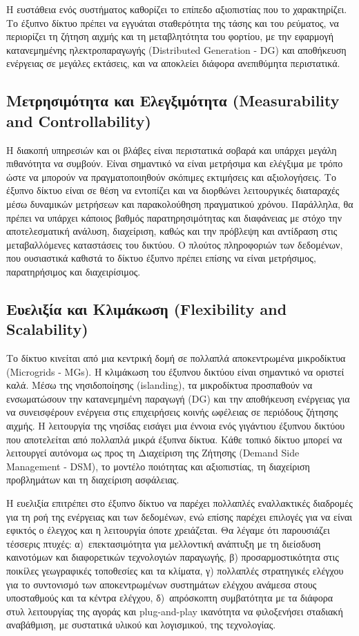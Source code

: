 \documentclass[12pt, a4paper, oneside]{report}
\begin{document}
Η ευστάθεια ενός συστήματος καθορίζει το επίπεδο αξιοπιστίας που το χαρακτηρίζει. Το έξυπνο δίκτυο πρέπει να εγγυάται σταθερότητα της τάσης και του ρεύματος, να περιορίζει τη ζήτηση αιχμής και τη μεταβλητότητα του φορτίου, με την εφαρμογή κατανεμημένης ηλεκτροπαραγωγής (Distributed Generation - DG) και αποθήκευση ενέργειας σε μεγάλες εκτάσεις, και να αποκλείει διάφορα ανεπιθύμητα περιστατικά.

\subsection*{Μετρησιμότητα και Ελεγξιμότητα (\textenglish{Measurability and Controllability})}

Η διακοπή υπηρεσιών και οι βλάβες είναι περιστατικά σοβαρά και υπάρχει μεγάλη πιθανότητα να συμβούν. Είναι σημαντικό να είναι μετρήσιμα και ελέγξιμα με τρόπο ώστε να μπορούν να πραγματοποιηθούν σκόπιμες εκτιμήσεις και αξιολογήσεις. Το έξυπνο δίκτυο είναι σε θέση να εντοπίζει και να διορθώνει λειτουργικές διαταραχές μέσω δυναμικών μετρήσεων και παρακολούθηση πραγματικού χρόνου. Παράλληλα, θα πρέπει να υπάρχει κάποιος βαθμός παρατηρησιμότητας και διαφάνειας με στόχο την αποτελεσματική ανάλυση, διαχείριση, καθώς και την πρόβλεψη και αντίδραση στις μεταβαλλόμενες καταστάσεις του δικτύου. Ο πλούτος πληροφοριών των δεδομένων, που ουσιαστικά καθιστά το δίκτυο έξυπνο πρέπει επίσης να είναι μετρήσιμος, παρατηρήσιμος και διαχειρίσιμος.

\subsection*{Ευελιξία και Κλιμάκωση (\textenglish{Flexibility and Scalability})}

Το δίκτυο κινείται από μια κεντρική δομή σε πολλαπλά αποκεντρωμένα μικροδίκτυα (Microgrids - MGs). Η κλιμάκωση του έξυπνου δικτύου είναι σημαντικό να οριστεί καλά. Μέσω της νησιδοποίησης (islanding), τα μικροδίκτυα προσπαθούν να ενσωματώσουν την κατανεμημένη παραγωγή (DG) και την αποθήκευση ενέργειας για να συνεισφέρουν ενέργεια στις επιχειρήσεις κοινής ωφέλειας σε περιόδους ζήτησης αιχμής. Η λειτουργία της νησίδας εισάγει μια έννοια ενός γιγάντιου έξυπνου δικτύου που αποτελείται από πολλαπλά μικρά έξυπνα δίκτυα. Κάθε τοπικό δίκτυο μπορεί να λειτουργεί αυτόνομα ως προς τη Διαχείριση της Ζήτησης (Demand Side Management - DSM), το μοντέλο ποιότητας και αξιοπιστίας, τη διαχείριση προβλημάτων και τη διαχείριση ασφάλειας.

Η ευελιξία επιτρέπει στο έξυπνο δίκτυο να παρέχει πολλαπλές εναλλακτικές διαδρομές για τη ροή της ενέργειας και των δεδομένων, ενώ επίσης παρέχει επιλογές για να είναι εφικτός ο έλεγχος και η λειτουργία όποτε χρειάζεται. Θα λέγαμε ότι παρουσιάζει τέσσερις πτυχές: \mbox{α) επεκτασιμότητα} για μελλοντική ανάπτυξη με τη διείσδυση καινοτόμων και διαφορετικών τεχνολογιών παραγωγής, β) προσαρμοστικότητα στις ποικίλες γεωγραφικές τοποθεσίες και τα κλίματα, γ) πολλαπλές στρατηγικές ελέγχου για το συντονισμό των αποκεντρωμένων συστημάτων ελέγχου ανάμεσα στους υποσταθμούς και τα κέντρα ελέγχου, \mbox{δ) απρόσκοπτη} συμβατότητα με τα διάφορα στυλ λειτουργίας της αγοράς και plug-and-play ικανότητα να φιλοξενήσει σταδιακή αναβάθμιση, με συστατικά υλικού και λογισμικού, της τεχνολογίας.
\end{document}
